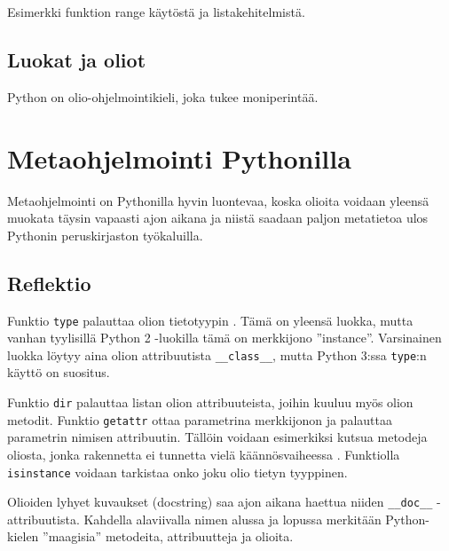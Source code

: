 \documentclass[finnish]{tktltiki2}
\theoremstyle{definition}
\theoremstyle{remark}
\begin{document}
\begin{listing}
    \inputminted[linenos]{python}{code/luvut.py}
    \caption{Esimerkki funktion range käytöstä ja listakehitelmistä.}
    \label{lst:ex_listakehis}
\end{listing}


\subsection{Luokat ja oliot}


Python on olio-ohjelmointikieli, joka tukee moniperintää.






\section{Metaohjelmointi Pythonilla}

Metaohjelmointi on Pythonilla hyvin luontevaa, koska olioita voidaan yleensä muokata täysin vapaasti ajon aikana ja niistä saadaan paljon metatietoa ulos Pythonin peruskirjaston työkaluilla.

 
\subsection{Reflektio}

Funktio \verb|type| palauttaa olion tietotyypin \cite{dive-into-python}. Tämä on yleensä luokka, mutta vanhan tyylisillä Python 2 -luokilla tämä on merkkijono ''instance''. Varsinainen luokka löytyy aina olion attribuutista \verb|__class__|, mutta Python 3:ssa \verb|type|:n käyttö on suositus.

Funktio \verb|dir| palauttaa listan olion attribuuteista, joihin kuuluu myös olion metodit. Funktio \verb|getattr| ottaa parametrina merkkijonon ja palauttaa parametrin nimisen attribuutin. Tällöin voidaan esimerkiksi kutsua metodeja oliosta, jonka rakennetta ei tunnetta vielä käännösvaiheessa \cite{dive-into-python}. Funktiolla \verb|isinstance| voidaan tarkistaa onko joku olio tietyn tyyppinen. 

Olioiden lyhyet kuvaukset (docstring) saa ajon aikana haettua niiden \verb|__doc__| -attribuutista. Kahdella alaviivalla nimen alussa ja lopussa merkitään Python-kielen ''maagisia'' metodeita, attribuutteja ja olioita. 
\end{document}
